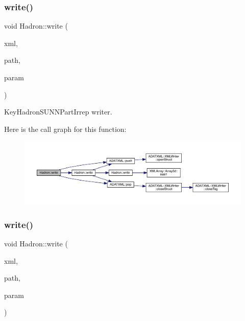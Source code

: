 \subsubsection{\texorpdfstring{write()}{write()}\hspace{0.1cm}{\footnotesize\ttfamily [10/95]}}
{\footnotesize\ttfamily void Hadron\+::write (\begin{DoxyParamCaption}\item[{\mbox{\hyperlink{classADATXML_1_1XMLWriter}{X\+M\+L\+Writer}} \&}]{xml,  }\item[{const std\+::string \&}]{path,  }\item[{const \mbox{\hyperlink{structHadron_1_1KeyHadronSUNNPartIrrep__t}{Key\+Hadron\+S\+U\+N\+N\+Part\+Irrep\+\_\+t}} \&}]{param }\end{DoxyParamCaption})}



Key\+Hadron\+S\+U\+N\+N\+Part\+Irrep writer. 

Here is the call graph for this function\+:
\nopagebreak
\begin{figure}[H]
\begin{center}
\leavevmode
\includegraphics[width=350pt]{d1/daf/namespaceHadron_a4d280edd65eda86698eae0d619c81a47_cgraph}
\end{center}
\end{figure}
\mbox{\label{namespaceHadron_a649265e2213fc38a7907196da52300cd}} 
\subsubsection{\texorpdfstring{write()}{write()}\hspace{0.1cm}{\footnotesize\ttfamily [11/95]}}
{\footnotesize\ttfamily void Hadron\+::write (\begin{DoxyParamCaption}\item[{\mbox{\hyperlink{classADATXML_1_1XMLWriter}{X\+M\+L\+Writer}} \&}]{xml,  }\item[{const std\+::string \&}]{path,  }\item[{const \mbox{\hyperlink{structHadron_1_1KeyHadronNPartIrrep__t}{Key\+Hadron\+N\+Part\+Irrep\+\_\+t}} \&}]{param }\end{DoxyParamCaption})}




